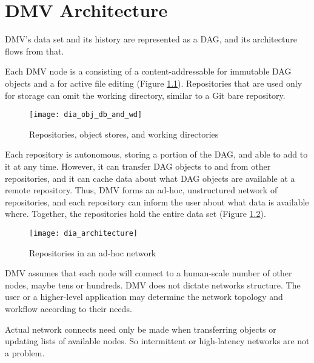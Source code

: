 \chapter{DMV Architecture}

DMV's data set and its history are represented as a DAG, and its architecture
flows from that.

Each DMV node is a  consisting of a content-addressable
 for immutable DAG objects and a  for active file editing (Figure \ref{fig:dia_obj_db_and_wd}).
Repositories that are used only for storage can omit the working directory,
similar to a Git bare repository.

\begin{figure}[h]
  \caption{Repositories, object stores, and working directories}
  \label{fig:dia_obj_db_and_wd}
  \centering
    \texttt{[image: dia\_obj\_db\_and\_wd]}
\end{figure}

Each repository is autonomous, storing a portion of the DAG, and able to add to
it at any time. However, it can transfer DAG objects to and from other
repositories, and it can cache data about what DAG objects are available at a
remote repository. Thus, DMV forms an ad-hoc, unstructured network of
repositories, and each repository can inform the user about what data is
available where. Together, the repositories hold the entire data set (Figure
\ref{fig:dia_architecture}).

\begin{figure}[h]
  \caption{Repositories in an ad-hoc network}
  \label{fig:dia_architecture}
  \centering
    \texttt{[image: dia\_architecture]}
\end{figure}

DMV assumes that each node will connect to a human-scale number of other nodes,
maybe tens or hundreds. DMV does not dictate networks structure. The user or a
higher-level application may determine the network topology and workflow
according to their needs.

Actual network connects need only be made when transferring objects or updating
lists of available nodes. So intermittent or high-latency networks are not a
problem.
